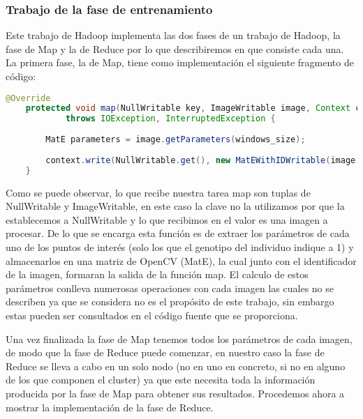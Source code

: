 \subsubsection{Trabajo de la fase de entrenamiento}

Este trabajo de Hadoop implementa las dos fases de un trabajo de Hadoop, la fase de Map y la de Reduce por lo que describiremos en que consiste cada una. La primera fase, la de Map, tiene como implementación el siguiente fragmento de c\'odigo:

 \begin{lstlisting}[language=Java]
	@Override
	protected void map(NullWritable key, ImageWritable image, Context context)
			throws IOException, InterruptedException {
		
		MatE parameters = image.getParameters(windows_size);
		
		context.write(NullWritable.get(), new MatEWithIDWritable(image.getId(), parameters));
	}
\end{lstlisting}

Como se puede observar, lo que recibe nuestra tarea map son tuplas de NullWritable y ImageWritable, en este caso la clave no la utilizamos por que la establecemos a NullWritable y lo que recibimos en el valor es una imagen a procesar. De lo que se encarga esta función es de extraer los parámetros de cada uno de los puntos de interés (solo los que el genotipo del individuo indique a 1) y almacenarlos en una matriz de OpenCV (MatE), la cual junto con el identificador de la imagen, formaran la salida de la función map. El calculo de estos parámetros conlleva numerosas operaciones con cada imagen las cuales no se describen ya que se considera no es el propósito de este trabajo, sin embargo estas pueden ser consultados en el código fuente que se proporciona.

Una vez finalizada la fase de Map tenemos todos los parámetros de cada imagen, de modo que la fase de Reduce puede comenzar, en nuestro caso la fase de Reduce se lleva a cabo en un solo nodo (no en uno en concreto, si no en alguno de los que componen el cluster) ya que este necesita toda la información producida por la fase de Map para obtener sus resultados. Procedemos ahora a mostrar la implementación de la fase de Reduce.

